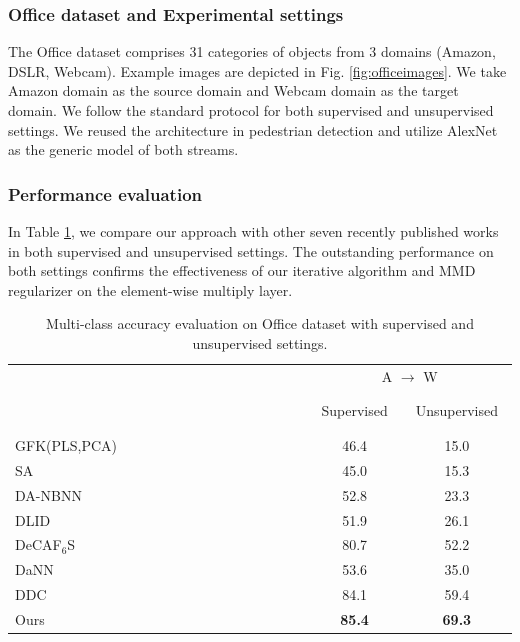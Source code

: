 \documentclass[runningheads]{llncs}
\begin{document}
\subsubsection{Office dataset and Experimental settings}
The Office dataset comprises 31 categories of objects from 3 domains (Amazon, DSLR, Webcam). Example images are depicted in Fig. \ref{fig:officeimages}. We take Amazon domain as the source domain and Webcam domain as the target domain. We follow the standard protocol for both supervised and unsupervised settings. We reused the architecture in pedestrian detection and utilize AlexNet \cite{krizhevsky2012imagenet} as the generic model of both streams.


\subsubsection{Performance evaluation}
In Table \ref{table:office}, we compare our approach with other seven recently published works in both supervised and unsupervised settings. The outstanding performance on both settings confirms the effectiveness of our iterative algorithm and MMD regularizer on the element-wise multiply layer.


\begin{table}
\centering
\caption{Multi-class accuracy evaluation on Office dataset with supervised and unsupervised settings.} \label{table:office}
\begin{tabular}{l c c}
  \hline
   & \multicolumn{2}{c}{A $\rightarrow$ W}    \\
   \cline{2-3}
   ~~~~~~~~~~~~~~~~~~~~~~~~~~~~~~~
   ~~~~~~~~~~~~~~~~~~~~~~~~~~~~~~~
    & ~Supervised~ & ~Unsupervised~ \\
  \hline
  GFK(PLS,PCA)\cite{gong2012geodesic} & 46.4 & 15.0 \\
  SA \cite{fernando2013unsupervised} & 45.0 & 15.3 \\
  DA-NBNN \cite{tommasi2013frustratingly} & 52.8 & 23.3 \\
  DLID \cite{chopra2013dlid}& 51.9 & 26.1 \\
  DeCAF${}_{6}$S \cite{donahue2013decaf} & 80.7 & 52.2 \\
  DaNN \cite{ghifary2014domain}& 53.6 & 35.0 \\
  DDC\cite{tzeng2014deep} & 84.1 & 59.4 \\
  \hline
  Ours & {\bf 85.4} & {\bf 69.3} \\
  \hline
\end{tabular}
\end{table}
\end{document}
